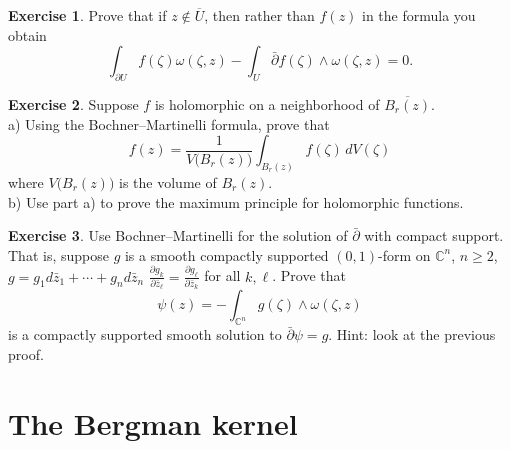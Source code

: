 \documentclass[12pt,openany]{book}
\newcommand{\C}{{\mathbb{C}}}
\theoremstyle{plain}
\theoremstyle{remark}
\theoremstyle{definition}
\newenvironment{exbox}{%
    \def\FrameCommand{\vrule width 1pt \relax\hspace {10pt}}%
    \MakeFramed {\advance \hsize -\width \FrameRestore }%
}{%
    \endMakeFramed
}
\theoremstyle{exercise}
\newtheorem{exercise}{Exercise}[section]
\theoremstyle{example}
\begin{document}
\begin{exbox}
\begin{exercise}
Prove that if $z \notin \overline{U}$, then rather than $f(z)$ in the
formula you obtain
\begin{equation*}
\int_{\partial U}
f(\zeta) \omega(\zeta,z)
-
\int_{U}
\bar{\partial} f(\zeta) \wedge \omega(\zeta,z) = 0 .
\end{equation*}
\end{exercise}

\begin{exercise}
Suppose $f$ is holomorphic on a neighborhood of
$\overline{B_r(z)}$.\\
a) Using the Bochner--Martinelli formula, prove that
\begin{equation*}
f(z) = \frac{1}{V\bigl(B_r(z)\bigr)} \int_{B_r(z)} f(\zeta) \, dV(\zeta)
\end{equation*}
where $V\bigl(B_r(z)\bigr)$ is the volume of $B_r(z)$.\\
b) Use part a) to prove the maximum principle for holomorphic functions.
\end{exercise}

\begin{exercise}
Use Bochner--Martinelli for the solution of $\bar{\partial}$ with compact
support.  That is, suppose $g$ is a smooth compactly supported $(0,1)$-form
on $\C^n$, $n \geq 2$, $g = g_1 d\bar{z}_1 + \cdots + g_n d\bar{z}_n$
$\frac{\partial g_k}{\partial \bar{z}_\ell} =
\frac{\partial g_\ell}{\partial \bar{z}_k}$ for all $k, \ell$.
Prove that
\begin{equation*}
\psi(z) = - \int_{\C^n} g(\zeta) \wedge \omega(\zeta,z)
\end{equation*}
is a compactly supported smooth solution to $\bar{\partial} \psi = g$.
Hint: look at the previous proof.
\end{exercise}
\end{exbox}


\section{The Bergman kernel}
\end{document}
